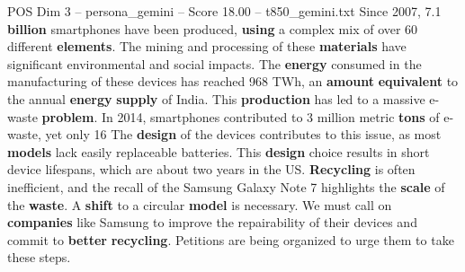 \begin{textsample}{POS Dim 3 – persona\_gemini – Score 18.00 – t850\_gemini.txt}  \label{ex:f3_pos_044}
Since 2007, 7.1 \textbf{billion} smartphones have been produced, \textbf{using} a complex mix of over 60 different \textbf{elements}.
The mining and processing of these \textbf{materials} have significant environmental and social impacts.
The \textbf{energy} consumed in the manufacturing of these devices has reached 968 TWh, an \textbf{amount} \textbf{equivalent} to the annual \textbf{energy} \textbf{supply} of India.
This \textbf{production} has led to a massive e-waste \textbf{problem}.
In 2014, smartphones contributed to 3 million metric \textbf{tons} of e-waste, yet only 16 %
The \textbf{design} of the devices contributes to this issue, as most \textbf{models} lack easily replaceable batteries.
This \textbf{design} choice results in short device lifespans, which are about two years in the US. \textbf{Recycling} is often inefficient, and the recall of the Samsung Galaxy Note 7 highlights the \textbf{scale} of the \textbf{waste}.
A \textbf{shift} to a circular \textbf{model} is necessary.
We must call on \textbf{companies} like Samsung to improve the repairability of their devices and commit to \textbf{better} \textbf{recycling}.
Petitions are being organized to urge them to take these steps.

\end{textsample}
